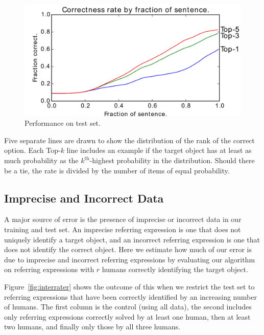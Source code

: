 \documentclass[conference]{IEEEtran}
\numberwithin{equation}{section}
\begin{document}
\begin{figure}[h]
  \centering
  \includegraphics[width=\columnwidth]{eval/cdf_by_fraction}
  \caption{Performance on test set.}
  \label{fig:results_inc}
\end{figure}

Five separate lines are drawn to show the distribution of the rank of the correct option. Each Top-$k$ line includes an example if the target object has at least as much probability as the $k^\text{th}$-highest probability in the distribution. Should there be a tie, the rate is divided by the number of items of equal probability.

\subsection{Imprecise and Incorrect Data}

A major source of error is the presence of imprecise or incorrect data in our training and test set. An imprecise referring expression is one that does not uniquely identify a target object, and an incorrect referring expression is one that does not identify the correct object. Here we estimate how much of our error is due to imprecise and incorrect referring expressions by evaluating our algorithm on referring expressions with $r$ humans correctly identifying the target object.

Figure~\ref{fig:interrater} shows the outcome of this when we restrict the test set to referring expressions that have been correctly identified by an increasing number of humans. The first column is the control (using all data), the second includes only referring expressions correctly solved by at least one human, then at least two humans, and finally only those by all three humans.
\end{document}
